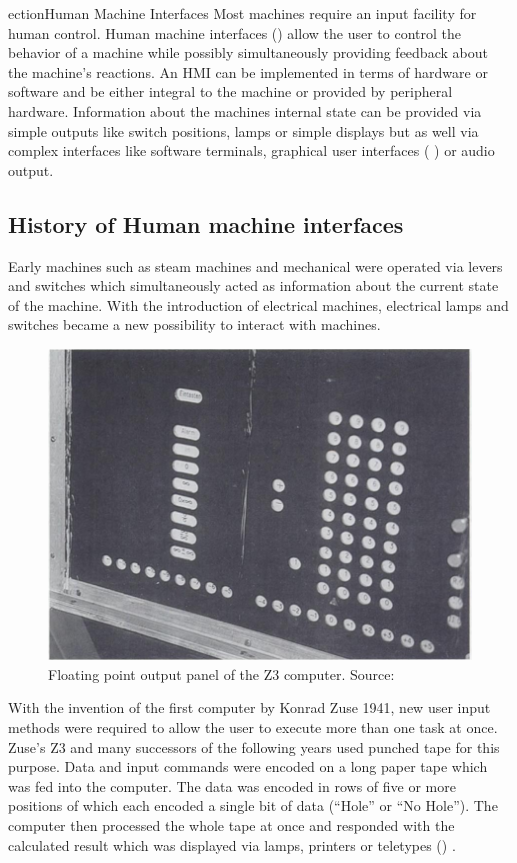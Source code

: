 ection{Human Machine Interfaces}
Most machines require an input facility for human control. Human machine interfaces () allow the user to control the behavior of a machine while possibly simultaneously providing feedback about the machine's reactions. An HMI can be implemented in terms of hardware or software and be either integral to the machine or provided by peripheral hardware. Information about the machines internal state can be provided via simple outputs like switch positions, lamps or simple displays but as well via complex interfaces like software terminals, graphical user interfaces ( ) or audio output.

\subsection{History of Human machine interfaces}
Early machines such as steam machines and mechanical were operated via levers and switches which simultaneously acted as information about the current state of the machine. With the introduction of electrical machines, electrical lamps and switches became a new possibility to interact with machines. 

\begin{figure}
	\centering
		\includegraphics{Ressourcen/z3_output.png}
	\caption{Floating point output panel of the Z3 computer. Source: \cite{Jacko2003}}
	\label{fig:z3_output}
\end{figure}


With the invention of the first computer by Konrad Zuse 1941, new user input methods were required to allow the user to execute more than one task at once.
Zuse's Z3 and many successors of the following years used punched tape for this purpose. Data and input commands were encoded on a long paper tape which was fed into the computer. The data was encoded in rows of five or more positions of which each encoded a single bit of data ("`Hole"' or "`No Hole"'). The computer then processed the whole tape at once and responded with the calculated result which was displayed via lamps, printers or teletypes () \cite{Jacko2003}.

